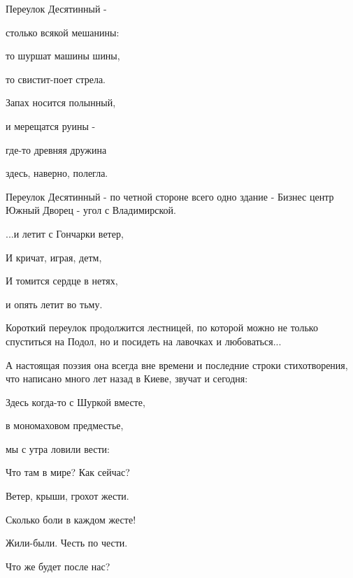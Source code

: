 Переулок Десятинный -\par
столько всякой мешанины:\par
то шуршат машины шины,\par
то свистит-поет стрела.\par
Запах носится полынный,\par
и мерещатся руины -\par
где-то древняя дружина\par
здесь, наверно, полегла.\par

Переулок Десятинный - по четной стороне всего одно здание - Бизнес центр Южный Дворец - угол с Владимирской. \par

...и летит с Гончарки ветер,\par
И кричат, играя, детм,\par
И томится сердце в нетях,\par
и опять летит во тьму.\par

Короткий переулок продолжится лестницей, по которой можно не только спуститься на Подол, но и посидеть на лавочках и любоваться...\par
А настоящая поэзия она всегда вне времени и последние строки стихотворения, что написано много лет назад в Киеве, звучат и сегодня:\par

Здесь когда-то с Шуркой вместе,\par
в мономаховом предместье,\par
мы с утра ловили вести:\par
Что там в мире? Как сейчас?\par
Ветер, крыши, грохот жести.\par
Сколько боли в каждом жесте!\par
Жили-были. Честь по чести.\par
Что же будет после нас?\par

